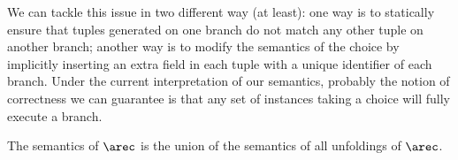 


\hsl
  We can tackle this issue in two different way (at least): one way is
  to statically ensure that tuples generated on one branch do not
  match any other tuple on another branch; another way is to modify the
  semantics of the choice by implicitly inserting an extra field in
  each tuple with a unique identifier of each branch.
  \newline
  Under the current interpretation of our semantics, probably the
  notion of correctness we can guarantee is that any set of instances
  taking a choice will fully execute a branch.

  
The semantics of $\arec$ is the union of the semantics of all
unfoldings of $\arec$.

\hsl



